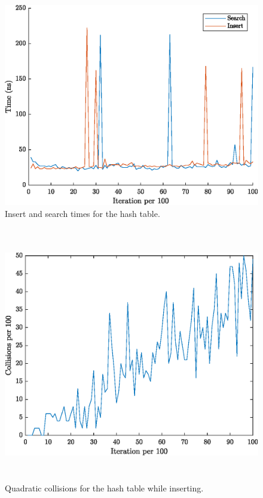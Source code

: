 \documentclass{article}
\begin{document}
\hfill \break

\begin{figure}[!htb]
    \centering
    \includegraphics{hashBoth.eps}
    \caption{Insert and search times for the hash table.}
\end{figure}

\hfill \break

\newpage

\begin{figure}[!htb]
    \centering
    \includegraphics[height=30em]{HashCollisions.eps}
    \caption{Quadratic collisions for the hash table while inserting.}
\end{figure}
\end{document}
